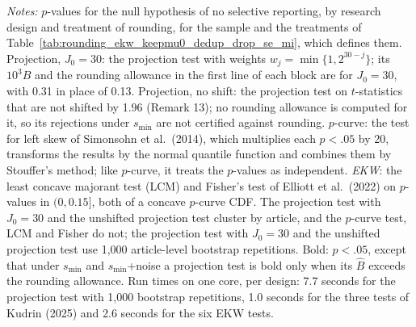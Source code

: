 \begin{table}[htbp]
\medskip
\begin{minipage}{\linewidth}
\footnotesize
\textit{Notes:} $p$-values for the null hypothesis of no selective reporting, by research design and treatment of rounding, for the sample and the treatments of Table~\ref{tab:rounding_ekw_keepmu0_dedup_drop_se_mi}, which defines them.
Projection, $J_0=30$: the projection test with weights $w_j=\min\{1,2^{30-j}\}$; its $10^3\widehat{B}$ and the rounding allowance in the first line of each block are for $J_0=30$, with 0.31 in place of 0.13.
Projection, no shift: the projection test on $t$-statistics that are not shifted by 1.96 (Remark 13); no rounding allowance is computed for it, so its rejections under $s_{\min}$ are not certified against rounding.
$p$-curve: the test for left skew of Simonsohn et al.\ (2014), which multiplies each $p<.05$ by 20, transforms the results by the normal quantile function and combines them by Stouffer's method; like $p$-curve, it treats the $p$-values as independent.
\textit{EKW}: the least concave majorant test (LCM) and Fisher's test of Elliott et al.\ (2022) on $p$-values in $(0,0.15]$, both of a concave $p$-curve CDF.
The projection test with $J_0=30$ and the unshifted projection test cluster by article, and the $p$-curve test, LCM and Fisher do not; the projection test with $J_0=30$ and the unshifted projection test use 1,000 article-level bootstrap repetitions.
Bold: $p<.05$, except that under $s_{\min}$ and $s_{\min}$+noise a projection test is bold only when its $\widehat{B}$ exceeds the rounding allowance.
Run times on one core, per design: 7.7 seconds for the projection test with 1,000 bootstrap repetitions, 1.0 seconds for the three tests of Kudrin (2025) and 2.6 seconds for the six EKW tests.
\end{minipage}
\end{table}
